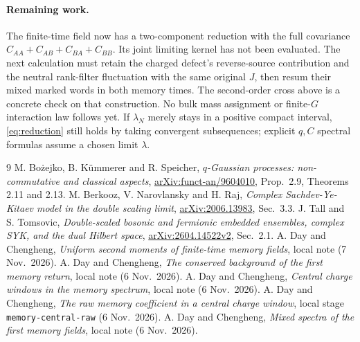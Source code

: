 \documentclass[11pt,a4paper]{article}
\begin{document}
\paragraph{Remaining work.}
The finite-time field now has a two-component reduction with the
full covariance $C_{AA}+C_{AB}+C_{BA}+C_{BB}$. Its joint limiting
kernel has not been evaluated. The next calculation must retain
the charged defect's reverse-source contribution and the neutral
rank-filter fluctuation with the same original $J$, then resum
their mixed marked words in both memory times. The second-order
cross above is a concrete check on that construction. No bulk
mass assignment or finite-$G$ interaction law follows yet.
If $\lambda_N$ merely stays in a positive compact interval,
\eqref{eq:reduction} still holds by taking convergent subsequences;
explicit $q,C$ spectral formulas assume a chosen limit $\lambda$.

\begin{thebibliography}{9}\small
{} M. Bo\.{z}ejko, B. K\"ummerer and R. Speicher,
\emph{$q$-Gaussian processes: non-commutative and classical aspects},
\href{https://arxiv.org/abs/funct-an/9604010}{arXiv:funct-an/9604010},
Prop.~2.9, Theorems 2.11 and 2.13.
 M. Berkooz, V. Narovlansky and H. Raj,
\emph{Complex Sachdev-Ye-Kitaev model in the double scaling limit},
\href{https://arxiv.org/abs/2006.13983}{arXiv:2006.13983}, Sec.~3.3.
 J. Tall and S. Tomsovic,
\emph{Double-scaled bosonic and fermionic embedded ensembles,
complex SYK, and the dual Hilbert space},
\href{https://arxiv.org/abs/2604.14522}{arXiv:2604.14522v2}, Sec.~2.1.
 A. Day and Chengheng,
\emph{Uniform second moments of finite-time memory fields}, local note (7 Nov.~2026).
 A. Day and Chengheng,
\emph{The conserved background of the first memory return}, local note (6 Nov.~2026).
 A. Day and Chengheng,
\emph{Central charge windows in the memory spectrum}, local note (6 Nov.~2026).
 A. Day and Chengheng,
\emph{The raw memory coefficient in a central charge window}, local stage
\texttt{memory-central-raw} (6 Nov.~2026).
 A. Day and Chengheng,
\emph{Mixed spectra of the first memory fields}, local note (6 Nov.~2026).
\end{thebibliography}
\end{document}
